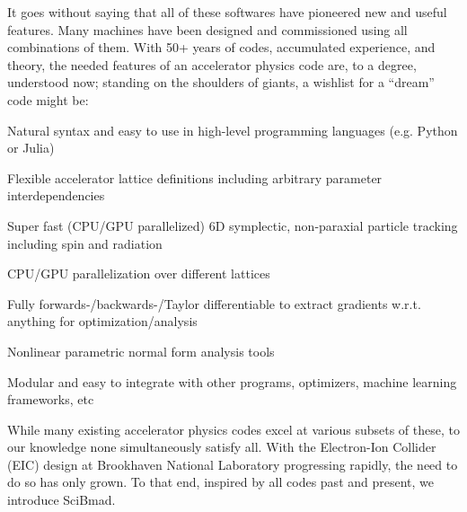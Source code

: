 \documentclass[a4paper,
               biblatex,     %
               ]{jacow}
\begin{document}
It goes without saying that all of these softwares have pioneered new and useful features. Many machines have been designed and commissioned using all combinations of them. With 50+ years of codes, accumulated experience, and theory, the needed features of an accelerator physics code are, to a degree, understood now; standing on the shoulders of giants, a wishlist for a ``dream'' code might be:



\begin{todolist}
\item Natural syntax and easy to use in high-level programming languages (e.g. Python or Julia)
\item Flexible accelerator lattice definitions including arbitrary parameter interdependencies
\item Super fast (CPU/GPU parallelized) 6D symplectic, non-paraxial particle tracking including spin and radiation
\item CPU/GPU parallelization over different lattices
\item Fully forwards-/backwards-/Taylor differentiable to extract gradients w.r.t. anything for optimization/analysis
\item Nonlinear parametric normal form analysis tools
\item Modular and easy to integrate with other programs, optimizers, machine learning frameworks, etc
\end{todolist}
While many existing accelerator physics codes excel at various subsets of these, to our knowledge none simultaneously satisfy all. With the Electron-Ion Collider (EIC) design at Brookhaven National Laboratory progressing rapidly, the need to do so has only grown. To that end, inspired by all codes past and present, we introduce SciBmad.
\end{document}
